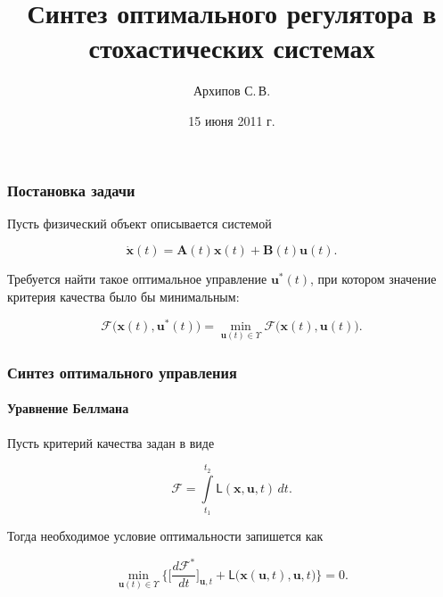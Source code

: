 \documentclass[ignorenonframetext,hyperref={pdftex,unicode,pdfpagelabels=false},compress]{beamer}
\title{Синтез оптимального регулятора в стохастических системах}
\author{Архипов С.\,В.}
\institute{Научный руководитель: Пакшин П.\,В.}
\date{15 июня 2011 г.}
\begin{document}
\begin{frame}
    \titlepage
\end{frame}



\begin{frame}
    \frametitle{Постановка задачи}

    Пусть физический объект описывается системой

    \begin{equation}\label{eq:1}
        \dot{\mathbf{x}}(t) = \mathbf{A}(t)\mathbf{x}(t) + \mathbf{B}(t)\mathbf{u}(t) \text{.}
    \end{equation}

    Требуется найти такое оптимальное управление $\mathbf{u}^*(t)$, при котором значение критерия качества было бы минимальным:

    \begin{equation}\label{eq:2}
        \mathcal{F} \bigl(  \mathbf{x}(t), \mathbf{u}^*(t)  \bigr) = \min_{\mathbf{u}(t) \in \Upsilon} \mathcal{F} \bigl(  \mathbf{x}(t), \mathbf{u}(t)  \bigr)  \text{.}
    \end{equation}
\end{frame}



\begin{frame}
    \frametitle{Синтез оптимального управления}
    \framesubtitle{Уравнение Беллмана}

    Пусть критерий качества задан в виде

    \begin{equation}\label{eq:3}
        \mathcal{F} = \int\limits_{t_1}^{t_2} \mathsf{L}(\mathbf{x}, \mathbf{u}, t)\,dt \text{.}
    \end{equation}

    Тогда необходимое условие оптимальности запишется как

    \begin{equation}\label{eq:4}
        \underset{\mathbf{u}(t) \in \Upsilon}{\min} \biggl\{ \biggl[ \frac{d \mathcal{F}^*}{d t} \biggr]_{\mathbf{u}, t} + \mathsf{L}\bigl(  \mathbf{x}(\mathbf{u}, t), \mathbf{u}, t  \bigr) \biggr\} = 0 \text{.}
    \end{equation}
\end{frame}
\end{document}
